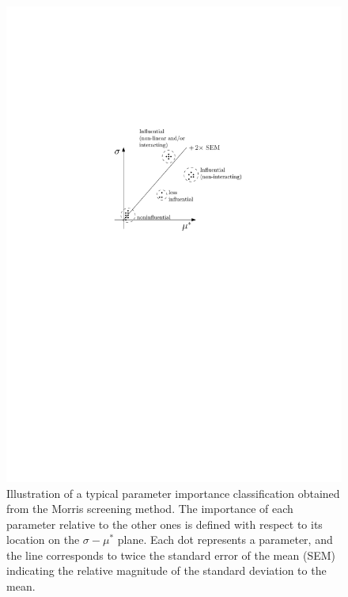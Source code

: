 \begin{figure}[bth]
	\centering
	\includegraphics[scale=0.80]{../figures/chapter3/figures/importance_classification}
	\caption[Illustration of a typical parameter importance classification based on Morris screening method]{Illustration of a typical parameter importance classification obtained from the Morris screening method. The importance of each parameter relative to the other ones is defined with respect to its location on the $\sigma - \mu^*$ plane. Each dot represents a parameter, and the line corresponds to twice the standard error of the mean (SEM) indicating the relative magnitude of the standard deviation to the mean.}\label{fig:ch3_importance_classification}
\end{figure}
